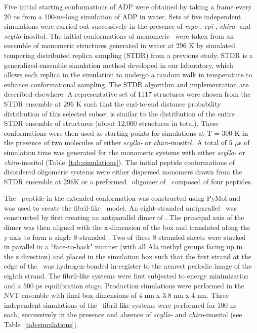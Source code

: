 Five initial starting conformations of ADP were obtained by taking a frame every 20 ns from a 100-ns-long simulation of ADP in water. Sets of five independent simulations were carried out successively in the presence of \textit{myo-}, \textit{epi-}, \textit{chiro-} and \textit{scyllo-}inositol. The initial conformations of monomeric \gafour\ were taken from an ensemble of monomeric structures generated in water at 296 K by simulated tempering distributed replica sampling (STDR) from a previous study.\cite{Nikolic:2011p57} STDR is a generalized-ensemble simulation method developed in our laboratory, which allows each replica in the simulation to undergo a random walk in temperature to enhance conformational sampling.\cite{Rodinger:2006p78} The STDR algorithm and implementation are described elsewhere.\cite{Rauscher:2009p41} A representative set of 1117 structures were chosen from the STDR ensemble at 296 K such that the end-to-end distance probability distribution of this selected subset is similar to the distribution of the entire STDR ensemble of structures (about 12,000 structures in total). These conformations were then used as starting points for simulations at T = 300 K in the presence of two molecules of either \textit{scyllo-} or \textit{chiro-}inositol. A total of 5 $\mu$s of simulation time was generated for the monomeric systems with either \textit{scyllo-} or \textit{chiro-}inositol (Table~\ref{tab:simulations}). The initial peptide conformations of disordered oligomeric systems were either dispersed monomers drawn from the STDR ensemble at 296K or a preformed \bsheet\ oligomer of \gafour\ composed of four peptides.

The \gafour\ peptide in the extended conformation was constructed using PyMol and was used to create the fibril-like \bsheet\ model. An eight-stranded antiparallel \bsheet\ was constructed by first creating an antiparallel dimer of \gafour. The principal axis of the dimer was then aligned with the x-dimension of the box and translated along the y-axis to form a single 8-stranded \bsheet. Two of these 8-stranded sheets were stacked in parallel in a ``face-to-back" manner (with all Ala methyl groups facing up in the z direction) and placed in the simulation box such that the first strand at the edge of the \bsheets\ was hydrogen-bonded in-register to the nearest periodic image of the eighth strand. The fibril-like systems were first subjected to energy minimization and a 500 ps equilibration stage. Production simulations were performed in the NVT ensemble with final box dimensions of 4 nm x 3.8 nm x 4 nm. Three independent simulations of the \gafour\ fibril-like systems were performed for 100 ns each, successively in the presence and absence of \textit{scyllo-} and \textit{chiro-}inositol (see Table~\ref{tab:simulations}).

